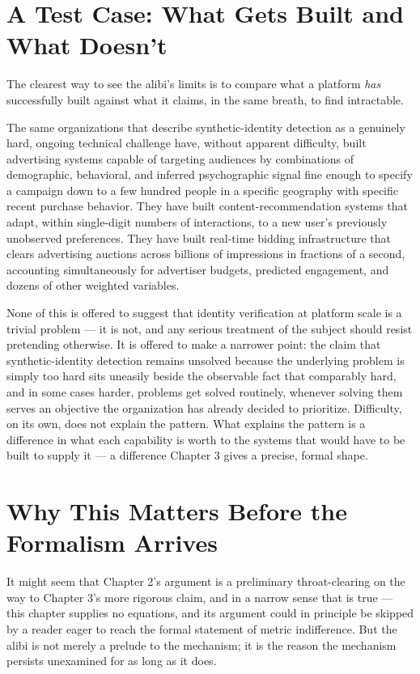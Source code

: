\documentclass[12pt,a4paper]{book}
\begin{document}
\section{A Test Case: What Gets Built and What Doesn't}

The clearest way to see the alibi's limits is to compare what a platform \emph{has} successfully built against what it claims, in the same breath, to find intractable.

The same organizations that describe synthetic-identity detection as a genuinely hard, ongoing technical challenge have, without apparent difficulty, built advertising systems capable of targeting audiences by combinations of demographic, behavioral, and inferred psychographic signal fine enough to specify a campaign down to a few hundred people in a specific geography with specific recent purchase behavior. They have built content-recommendation systems that adapt, within single-digit numbers of interactions, to a new user's previously unobserved preferences. They have built real-time bidding infrastructure that clears advertising auctions across billions of impressions in fractions of a second, accounting simultaneously for advertiser budgets, predicted engagement, and dozens of other weighted variables.

None of this is offered to suggest that identity verification at platform scale is a trivial problem — it is not, and any serious treatment of the subject should resist pretending otherwise. It is offered to make a narrower point: the claim that synthetic-identity detection remains unsolved because the underlying problem is simply too hard sits uneasily beside the observable fact that comparably hard, and in some cases harder, problems get solved routinely, whenever solving them serves an objective the organization has already decided to prioritize. Difficulty, on its own, does not explain the pattern. What explains the pattern is a difference in what each capability is worth to the systems that would have to be built to supply it — a difference Chapter 3 gives a precise, formal shape.

\section{Why This Matters Before the Formalism Arrives}

It might seem that Chapter 2's argument is a preliminary throat-clearing on the way to Chapter 3's more rigorous claim, and in a narrow sense that is true — this chapter supplies no equations, and its argument could in principle be skipped by a reader eager to reach the formal statement of metric indifference. But the alibi is not merely a prelude to the mechanism; it is the reason the mechanism persists unexamined for as long as it does.
\end{document}
